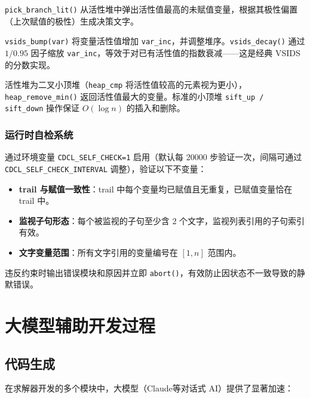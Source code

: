 \documentclass[12pt,a4paper]{article}
\begin{document}
\texttt{pick\_branch\_lit()} 从活性堆中弹出活性值最高的未赋值变量，根据其极性偏置（上次赋值的极性）生成决策文字。

\texttt{vsids\_bump(var)} 将变量活性值增加 \texttt{var\_inc}，并调整堆序。\texttt{vsids\_decay()} 通过 $1 / 0.95$ 因子缩放 \texttt{var\_inc}，等效于对已有活性值的指数衰减——这是经典 VSIDS 的分数实现。

活性堆为二叉小顶堆（\texttt{heap\_cmp} 将活性值较高的元素视为更小），\texttt{heap\_remove\_min()} 返回活性值最大的变量。标准的小顶堆 \texttt{sift\_up / sift\_down} 操作保证 $O(\log n)$ 的插入和删除。

\subsubsection{运行时自检系统}

通过环境变量 \texttt{CDCL\_SELF\_CHECK=1} 启用（默认每 20000 步验证一次，间隔可通过 \texttt{CDCL\_SELF\_CHECK\_INTERVAL} 调整），验证以下不变量：

\begin{itemize}[label=$\bullet$]
    \item \textbf{trail 与赋值一致性}：trail 中每个变量均已赋值且无重复，已赋值变量恰在 trail 中。
    \item \textbf{监视子句形态}：每个被监视的子句至少含 2 个文字，监视列表引用的子句索引有效。
    \item \textbf{文字变量范围}：所有文字引用的变量编号在 $[1, n]$ 范围内。
\end{itemize}

违反约束时输出错误模块和原因并立即 \texttt{abort()}，有效防止因状态不一致导致的静默错误。

\section{大模型辅助开发过程}

\subsection{代码生成}

在求解器开发的多个模块中，大模型（Claude等对话式 AI）提供了显著加速：
\end{document}
